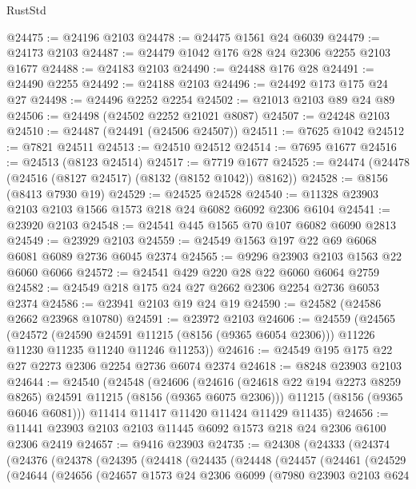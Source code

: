 \begin{lexlean}{RustStd}
\begin{coremodule}
{\begin{coremodule}
{{{{{{{{{{{{{{{{{{{{{{{{{{{{{{{{{{@24475 := @24196 @2103
@24478 := @24475 @1561 @24 @6039
@24479 := @24173 @2103
@24487 := @24479 @1042 @176 @28 @24 @2306 @2255 @2103 @1677
@24488 := @24183 @2103
@24490 := @24488 @176 @28
@24491 := @24490 @2255
@24492 := @24188 @2103
@24496 := @24492 @173 @175 @24 @27
@24498 := @24496 @2252 @2254
@24502 := @21013 @2103 @89 @24 @89
@24506 := @24498 (@24502 @2252 @21021 @8087)
@24507 := @24248 @2103
@24510 := @24487 (@24491 (@24506 @24507))
@24511 := @7625 @1042
@24512 := @7821 @24511
@24513 := @24510 @24512
@24514 := @7695 @1677
@24516 := @24513 (@8123 @24514)
@24517 := @7719 @1677
@24525 := @24474 (@24478 (@24516 (@8127 @24517) (@8132 (@8152 @1042)) @8162))
@24528 := @8156 (@8413 @7930 @19)
@24529 := @24525 @24528
@24540 := @11328 @23903 @2103 @2103 @1566 @1573 @218 @24 @6082 @6092 @2306 @6104
@24541 := @23920 @2103
@24548 := @24541 @445 @1565 @70 @107 @6082 @6090 @2813
@24549 := @23929 @2103
@24559 := @24549 @1563 @197 @22 @69 @6068 @6081 @6089 @2736 @6045 @2374
@24565 := @9296 @23903 @2103 @1563 @22 @6060 @6066
@24572 := @24541 @429 @220 @28 @22 @6060 @6064 @2759
@24582 := @24549 @218 @175 @24 @27 @2662 @2306 @2254 @2736 @6053 @2374
@24586 := @23941 @2103 @19 @24 @19
@24590 := @24582 (@24586 @2662 @23968 @10780)
@24591 := @23972 @2103
@24606 := @24559
    (@24565
      (@24572
        (@24590 @24591 @11215 (@8156 (@9365 @6054 @2306)))
        @11226
        @11230
        @11235
        @11240
        @11246
        @11253))
@24616 := @24549 @195 @175 @22 @27 @2273 @2306 @2254 @2736 @6074 @2374
@24618 := @8248 @23903 @2103
@24644 := @24540
    (@24548
      (@24606
        (@24616 (@24618 @22 @194 @2273 @8259 @8265) @24591 @11215 (@8156 (@9365 @6075 @2306)))
        @11215
        (@8156 (@9365 @6046 @6081)))
      @11414
      @11417
      @11420
      @11424
      @11429
      @11435)
@24656 := @11441 @23903 @2103 @2103 @11445 @6092 @1573 @218 @24 @2306 @6100 @2306 @2419
@24657 := @9416 @23903
@24735 := @24308
    (@24333
      (@24374
        (@24376
          (@24378
            (@24395
              (@24418
                (@24435
                  (@24448
                    (@24457
                      (@24461
                        (@24529
                          (@24644
                            (@24656
                              (@24657
                                @1573
                                @24
                                @2306
                                @6099
                                (@7980
                                  @23903
                                  @2103
                                  @624
}}}}}}}}}}}}}}}}}}}}}}}}}}}}}}}}}}
\end{coremodule}}
\end{coremodule}
\end{lexlean}
